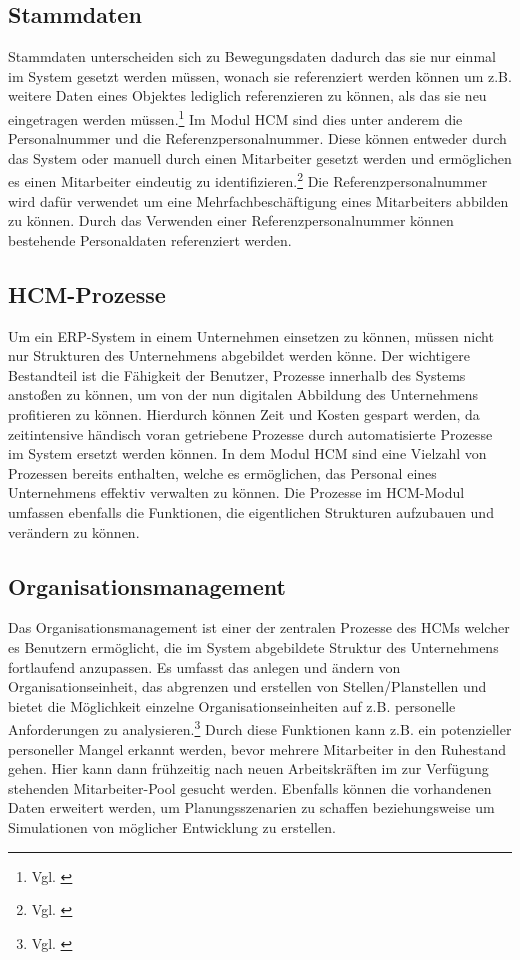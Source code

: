 \subsection{Stammdaten}
Stammdaten unterscheiden sich zu Bewegungsdaten dadurch das sie nur einmal im System gesetzt werden müssen, wonach sie referenziert werden können um z.B. weitere Daten eines Objektes lediglich referenzieren zu können, als das sie neu eingetragen werden müssen.\footnote{Vgl. \cite{SSSUM2019a}}
Im Modul HCM sind dies unter anderem die Personalnummer und die Referenzpersonalnummer.
Diese können entweder durch das System oder manuell durch einen Mitarbeiter gesetzt werden und ermöglichen es einen Mitarbeiter eindeutig zu identifizieren.\footnote{Vgl. \cite{SSSUM2019a}}
Die Referenzpersonalnummer wird dafür verwendet um eine Mehrfachbeschäftigung eines Mitarbeiters abbilden zu können.
Durch das Verwenden einer Referenzpersonalnummer können bestehende Personaldaten referenziert werden.
\subsection{HCM-Prozesse}
Um ein ERP-System in einem Unternehmen einsetzen zu können, müssen nicht nur Strukturen des Unternehmens abgebildet werden könne.
Der wichtigere Bestandteil ist die Fähigkeit der Benutzer, Prozesse innerhalb des Systems anstoßen zu können, um von der nun digitalen Abbildung des Unternehmens profitieren zu können.
Hierdurch können Zeit und Kosten gespart werden, da zeitintensive händisch voran getriebene Prozesse durch automatisierte Prozesse im System ersetzt werden können.
In dem Modul HCM sind eine Vielzahl von Prozessen bereits enthalten, welche es ermöglichen, das Personal eines Unternehmens effektiv verwalten zu können.
Die Prozesse im HCM-Modul umfassen ebenfalls die Funktionen, die eigentlichen Strukturen aufzubauen und verändern zu können.

\subsection{Organisationsmanagement}
Das Organisationsmanagement ist einer der zentralen Prozesse des HCMs welcher es Benutzern ermöglicht, die im System abgebildete Struktur des Unternehmens fortlaufend anzupassen.
Es umfasst das anlegen und ändern von Organisationseinheit, das abgrenzen und erstellen von Stellen/Planstellen und bietet die Möglichkeit einzelne Organisationseinheiten auf z.B. personelle Anforderungen zu analysieren.\footnote{Vgl. \cite{SSSUM2019a}}
Durch diese Funktionen kann z.B. ein potenzieller personeller Mangel erkannt werden, bevor mehrere Mitarbeiter in den Ruhestand gehen. Hier kann dann frühzeitig nach neuen Arbeitskräften im zur Verfügung stehenden Mitarbeiter-Pool gesucht werden.
Ebenfalls können die vorhandenen Daten erweitert werden, um Planungsszenarien zu schaffen beziehungsweise um Simulationen von möglicher Entwicklung zu erstellen.


